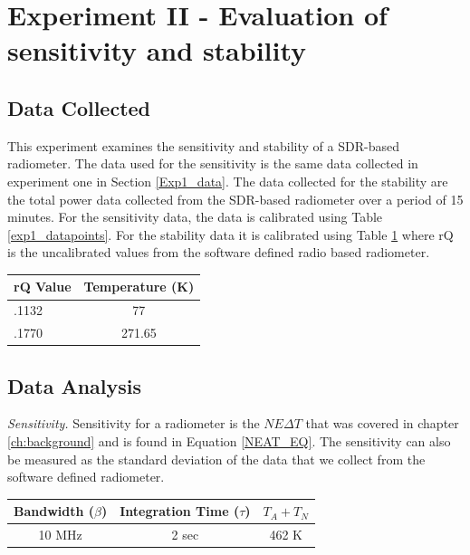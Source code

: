 \section{Experiment II - Evaluation of sensitivity and stability} \label{Exp2_results}

\subsection{Data Collected}
This experiment examines the sensitivity and stability of a SDR-based radiometer.  The data used for the sensitivity is the same data collected in experiment one in Section \ref{Exp1_data}.  The data collected for the stability are the total power data collected from the SDR-based radiometer over a period of 15 minutes.  For the sensitivity data, the data is calibrated using Table \ref{exp1_datapoints}.  For the stability data it is calibrated using Table \ref{exp2_datapoints} where rQ is the uncalibrated values from the software defined radio based radiometer.

\begin{table}[h!tb] \centering
{}
\label{exp2_datapoints}
\begin{tabular}{lc} \hline
\textbf{rQ Value} & \textbf{Temperature (K)} \\ \hline
.1132 & 77 \\
.1770 & 271.65 \\ \hline
\end{tabular}
\end{table}
 
\subsection{Data Analysis}\label{Exp2_analysis}

\emph{Sensitivity.}  Sensitivity for a radiometer is the $NE\Delta T$ that was covered in chapter \ref{ch:background} and is found in Equation \ref{NEAT_EQ}.  The sensitivity can also be measured as the standard deviation of the data that we collect from the software defined radiometer.  

\begin{table}[h!tb] \centering
{}
\label{exp2_param}
\begin{tabular}{ccc} \hline
\textbf{Bandwidth ($\beta$)} & \textbf{Integration Time ($\tau$)} & \textbf{$T_{A}+T_{N}$}\\ \hline
10 MHz & 2 sec & 462 K \\ \hline
\end{tabular}
\end{table}

